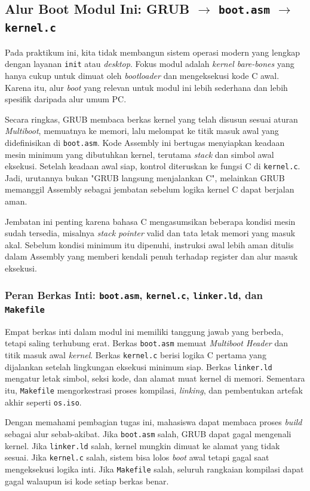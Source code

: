 \subsection{Alur Boot Modul Ini: GRUB $\rightarrow$ \texttt{boot.asm} $\rightarrow$ \texttt{kernel.c}}
Pada praktikum ini, kita tidak membangun sistem operasi modern yang lengkap dengan layanan \texttt{init} atau \textit{desktop}. Fokus modul adalah \textit{kernel bare-bones} yang hanya cukup untuk dimuat oleh \textit{bootloader} dan mengeksekusi kode C awal. Karena itu, alur \textit{boot} yang relevan untuk modul ini lebih sederhana dan lebih spesifik daripada alur umum PC.

Secara ringkas, GRUB membaca berkas kernel yang telah disusun sesuai aturan \textit{Multiboot}, memuatnya ke memori, lalu melompat ke titik masuk awal yang didefinisikan di \texttt{boot.asm}. Kode Assembly ini bertugas menyiapkan keadaan mesin minimum yang dibutuhkan kernel, terutama \textit{stack} dan simbol awal eksekusi. Setelah keadaan awal siap, kontrol diteruskan ke fungsi C di \texttt{kernel.c}. Jadi, urutannya bukan "GRUB langsung menjalankan C", melainkan GRUB memanggil Assembly sebagai jembatan sebelum logika kernel C dapat berjalan aman.

Jembatan ini penting karena bahasa C mengasumsikan beberapa kondisi mesin sudah tersedia, misalnya \textit{stack pointer} valid dan tata letak memori yang masuk akal. Sebelum kondisi minimum itu dipenuhi, instruksi awal lebih aman ditulis dalam Assembly yang memberi kendali penuh terhadap register dan alur masuk eksekusi.


\subsubsection{Peran Berkas Inti: \texttt{boot.asm}, \texttt{kernel.c}, \texttt{linker.ld}, dan \texttt{Makefile}}
Empat berkas inti dalam modul ini memiliki tanggung jawab yang berbeda, tetapi saling terhubung erat. Berkas \texttt{boot.asm} memuat \textit{Multiboot Header} dan titik masuk awal \textit{kernel}. Berkas \texttt{kernel.c} berisi logika C pertama yang dijalankan setelah lingkungan eksekusi minimum siap. Berkas \texttt{linker.ld} mengatur letak simbol, seksi kode, dan alamat muat kernel di memori. Sementara itu, \texttt{Makefile} mengorkestrasi proses kompilasi, \textit{linking}, dan pembentukan artefak akhir seperti \texttt{os.iso}.

Dengan memahami pembagian tugas ini, mahasiswa dapat membaca proses \textit{build} sebagai alur sebab-akibat. Jika \texttt{boot.asm} salah, GRUB dapat gagal mengenali kernel. Jika \texttt{linker.ld} salah, kernel mungkin dimuat ke alamat yang tidak sesuai. Jika \texttt{kernel.c} salah, sistem bisa lolos \textit{boot} awal tetapi gagal saat mengeksekusi logika inti. Jika \texttt{Makefile} salah, seluruh rangkaian kompilasi dapat gagal walaupun isi kode setiap berkas benar.


